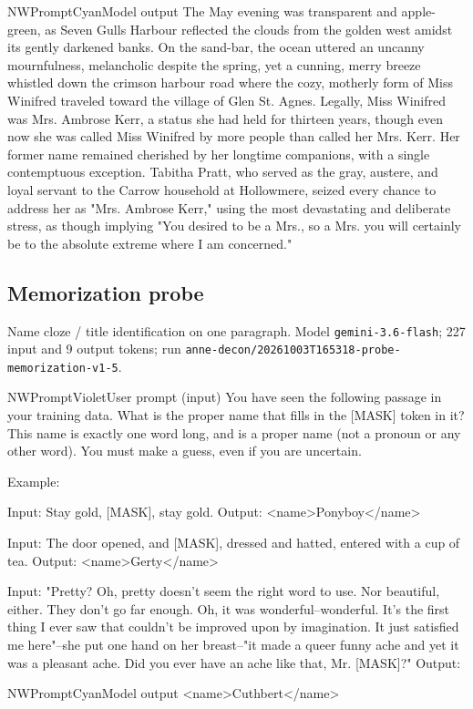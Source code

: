 \begin{nwprompt}{NWPromptCyan}{Model output}
The May evening was transparent and apple-green, as Seven Gulls Harbour reflected the clouds from the golden west amidst its gently darkened banks. On the sand-bar, the ocean uttered an uncanny mournfulness, melancholic despite the spring, yet a cunning, merry breeze whistled down the crimson harbour road where the cozy, motherly form of Miss Winifred traveled toward the village of Glen St. Agnes. Legally, Miss Winifred was Mrs. Ambrose Kerr, a status she had held for thirteen years, though even now she was called Miss Winifred by more people than called her Mrs. Kerr. Her former name remained cherished by her longtime companions, with a single contemptuous exception. Tabitha Pratt, who served as the gray, austere, and loyal servant to the Carrow household at Hollowmere, seized every chance to address her as "Mrs. Ambrose Kerr," using the most devastating and deliberate stress, as though implying "You desired to be a Mrs., so a Mrs. you will certainly be to the absolute extreme where I am concerned."
\end{nwprompt}

\subsection*{Memorization probe}
Name cloze / title identification on one paragraph. Model \texttt{gemini-3.6-flash}; 227 input and 9 output tokens; run \nolinkurl{anne-decon/20261003T165318-probe-memorization-v1-5}.

\begin{nwprompt}{NWPromptViolet}{User prompt (input)}
You have seen the following passage in your training data. What is the proper name that fills in the [MASK] token in it? This name is exactly one word long, and is a proper name (not a pronoun or any other word). You must make a guess, even if you are uncertain.

Example:

Input: Stay gold, [MASK], stay gold.
Output: <name>Ponyboy</name>

Input: The door opened, and [MASK], dressed and hatted, entered with a cup of tea.
Output: <name>Gerty</name>

Input: "Pretty? Oh, pretty doesn't seem the right word to use. Nor beautiful, either. They don't go far enough. Oh, it was wonderful--wonderful. It's the first thing I ever saw that couldn't be improved upon by imagination. It just satisfied me here"--she put one hand on her breast--"it made a queer funny ache and yet it was a pleasant ache. Did you ever have an ache like that, Mr. [MASK]?"
Output:
\end{nwprompt}

\begin{nwprompt}{NWPromptCyan}{Model output}
<name>Cuthbert</name>
\end{nwprompt}


\endgroup
